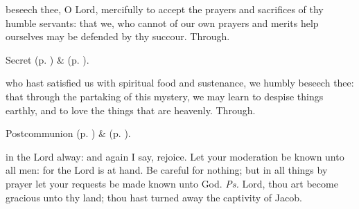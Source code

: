 \secret
{} beseech thee, O Lord, mercifully to accept the prayers and sacrifices of thy humble servants: that we, who cannot of our own prayers and merits help ourselves may be defended by thy succour. Through.

\begin{rubric}
     Secret  (p. \pageref{AdventISecret}) \&   (p. \pageref{SPMaryInAdvent}).
\end{rubric}


\postcommunion
{} who hast satisfied us with spiritual food and sustenance, we humbly beseech thee: that through the partaking of this mystery, we may learn to despise things earthly, and to love the things that are heavenly. Through.

\begin{rubric}
     Postcommunion  (p. \pageref{AdventIPostcommunion}) \&   (p. \pageref{SPMaryInAdvent}).
\end{rubric}




\vspace{-0.2\baselineskip}

\introit

\vspace{-0.13\baselineskip}

 in the Lord alway: and again I say, rejoice. Let your moderation be known unto all men: for the Lord is at hand. Be careful for nothing; but in all things by prayer let your requests be made known unto God. \textit{Ps.} Lord, thou art become gracious unto thy land; thou hast turned away the captivity of Jacob.

\vspace{-0.2\baselineskip}

\collect

\vspace{-0.14\baselineskip}

